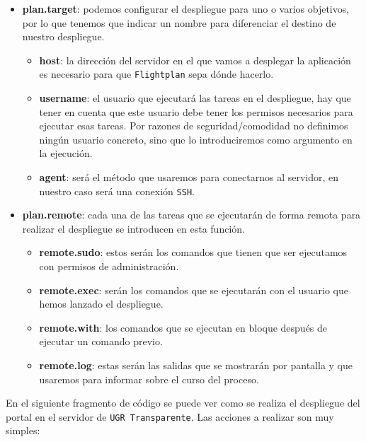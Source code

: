 \begin{itemize}
	\item \textbf{plan.target}: podemos configurar el despliegue para uno o varios objetivos, por lo que tenemos que indicar un nombre para diferenciar el destino de nuestro despliegue.
	\begin{itemize}
		\item \textbf{host}: la dirección del servidor en el que vamos a desplegar la aplicación es necesario para que {\tt Flightplan} sepa dónde hacerlo.
		\newpage
		\item \textbf{username}: el usuario que ejecutará las tareas en el despliegue, hay que tener en cuenta que este usuario debe tener los permisos necesarios para ejecutar esas tareas. Por razones de seguridad/comodidad no definimos ningún usuario concreto, sino que lo introduciremos como argumento en la ejecución.
		\item \textbf{agent}: será el método que usaremos para conectarnos al servidor, en nuestro caso será una conexión {\tt SSH}.
	\end{itemize}
	\item \textbf{plan.remote}: cada una de las tareas que se ejecutarán de forma remota para realizar el despliegue se introducen en esta función.
	\begin{itemize}
		\item \textbf{remote.sudo}: estos serán los comandos que tienen que ser ejecutamos con permisos de administración.
		\item \textbf{remote.exec}: serán los comandos que se ejecutarán con el usuario que hemos lanzado el despliegue.
		\item \textbf{remote.with}: los comandos que se ejecutan en bloque después de ejecutar un comando previo.
		\item \textbf{remote.log}: estas serán las salidas que se mostrarán por pantalla y que usaremos para informar sobre el curso del proceso.
	\end{itemize}	
\end{itemize}

En el siguiente fragmento de código se puede ver como se realiza el despliegue del portal en el servidor de {\tt UGR Transparente}. Las acciones a realizar son muy simples:

